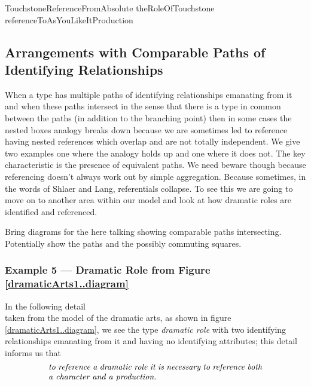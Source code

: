 TouchstoneReferenceFromAbsolute
theRoleOfTouchstone
referenceToAsYouLikeItProduction

\subsection{Arrangements with Comparable Paths of Identifying Relationships}
When a type has multiple paths of identifying relationships emanating from it and when these paths intersect in the sense that there is a type in common between the paths (in addition to the
branching point) then in some cases the nested boxes analogy breaks down
because we are sometimes led to reference having nested references which overlap and are not totally independent. We give two examples one where the analogy holds up and one where it does not. The key characteristic is the presence of equivalent paths.
We need beware though because referencing doesn't always work out by simple aggregation. Because sometimes,
in the words of Shlaer and Lang, referentials collapse. 
To see this we are going to move on to another area within our model and look at how dramatic roles are identified and referenced.

\begin{worktt}
Bring diagrams for the here talking showing comparable paths intersecting. 
Potentially show the paths and the possibly commuting squares.
\end{worktt}


 \subsubsection{Example 5 --- Dramatic Role from Figure \ref{dramaticArts1..diagram}}
\mynote
In the following detail
\begin{equation*}

\end{equation*}
taken from the model of the dramatic arts, as shown in figure \ref{dramaticArts1..diagram}, 
we see the type \textit{dramatic role} 
with  two identifying relationships emanating from it and having no identifying attributes;
this detail informs us that
\begin{equation}
\label{DramaticRoleReferencing}
\text{\parbox{9cm}{\textit{to reference a dramatic role it is necessary  
to reference both a character and  a production.}}}
\end{equation}

